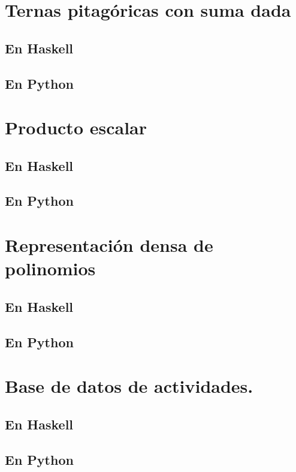 \documentclass[a4paper,12pt,twoside]{book}
\begin{document}
\section{Ternas pitagóricas con suma dada}
\subsection*{En Haskell}
\subsection*{En Python}

\section{Producto escalar}
\subsection*{En Haskell}
\subsection*{En Python}

\section{Representación densa de polinomios}
\subsection*{En Haskell}
\subsection*{En Python}

\section{Base de datos de actividades.}
\subsection*{En Haskell}
\subsection*{En Python}
\end{document}
